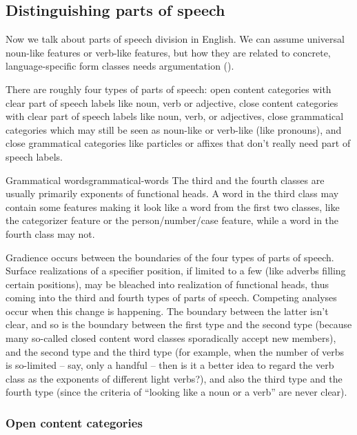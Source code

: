 \documentclass[UTF8, a4paper, oneside, scheme=plain]{ctexrep}
\begin{document}
\subsection{Distinguishing parts of speech}

Now we talk about parts of speech division in English.
We can assume universal noun-like features or verb-like features,
but how they are related to concrete, language-specific form classes needs argumentation 
().

There are roughly four types of parts of speech:
open content categories with clear part of speech labels like noun, verb or adjective,
close content categories with clear part of speech labels like noun, verb, or adjectives,
close grammatical categories which may still be seen as noun-like or verb-like (like pronouns),
and close grammatical categories like particles or affixes that don't really need part of speech labels.

\begin{theorybox}{Grammatical words}{grammatical-words}
    The third and the fourth classes are usually primarily exponents of functional heads.
    A word in the third class may contain some features making it look like a word from the first two classes,
    like the categorizer feature or the person/number/case feature,
    while a word in the fourth class may not.

    Gradience occurs between the boundaries of the four types of parts of speech.
    Surface realizations of a specifier position,
    if limited to a few (like adverbs filling certain positions),
    may be bleached into realization of functional heads,
    thus coming into the third and fourth types of parts of speech.
    Competing analyses occur when this change is happening.
    The boundary between the latter isn't clear,
    and so is the boundary between the first type and the second type
    (because many so-called closed content word classes 
    sporadically accept new members),
    and the second type and the third type
    (for example, when the number of verbs is so-limited -- say, only a handful -- 
    then is it a better idea to regard the verb class as the exponents of different light verbs?),
    and also the third type and the fourth type
    (since the criteria of ``looking like a noun or a verb'' are never clear).
\end{theorybox}

\subsubsection{Open content categories}
\end{document}
